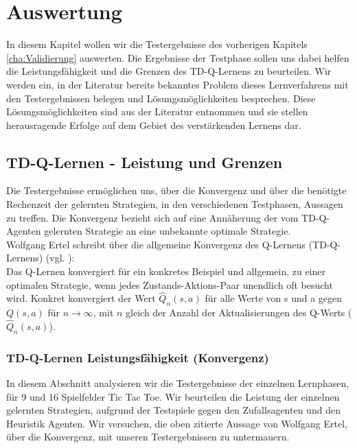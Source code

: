 \chapter{Auswertung}
\label{cha:Auswertung}
In diesem Kapitel wollen wir die Testergebnisse des vorherigen Kapitels \ref{cha:Validierung} auswerten. Die Ergebnisse der Testphase sollen uns dabei helfen die Leistungsfähigkeit und die Grenzen des TD-Q-Lernens zu beurteilen. Wir werden ein, in der Literatur bereits bekanntes Problem dieses Lernverfahrens mit den Testergebnissen belegen und Lösungsmöglichkeiten besprechen. Diese Lösungsmöglichkeiten sind aus der Literatur entnommen und sie stellen herausragende Erfolge auf dem Gebiet des verstärkenden Lernens dar. \\

\section{TD-Q-Lernen - Leistung und Grenzen}
\label{sec:TD-Q-Lernen - Leistung und Grenzen}
Die Testergebnisse ermöglichen uns, über die Konvergenz und über die benötigte Rechenzeit der gelernten Strategien, in den verschiedenen Testphasen, Aussagen zu treffen. Die Konvergenz bezieht sich auf eine Annäherung der vom TD-Q-Agenten gelernten Strategie an eine unbekannte optimale Strategie. \\

Wolfgang Ertel schreibt über die allgemeine Konvergenz des Q-Lernens (TD-Q-Lernens) (vgl. \cite[299]{Ertel}): \\

Das Q-Lernen konvergiert für ein konkretes Beispiel und allgemein, zu einer optimalen Strategie, wenn jedes Zustands-Aktions-Paar unendlich oft besucht wird. Konkret konvergiert der Wert $\hat{Q}_n(s,a)$ für alle Werte von s und a gegen $Q(s,a)$ für $n \rightarrow \infty$, mit $n$ gleich der Anzahl der Aktualisierungen des Q-Werts ($\hat{Q}_n(s,a)$).
\newpage

\subsection{TD-Q-Lernen Leistungsfähigkeit (Konvergenz)}
In diesem Abschnitt analysieren wir die Testergebnisse der einzelnen Lernphasen, für 9 und 16 Spielfelder Tic Tac Toe. Wir beurteilen die Leistung der einzelnen gelernten Strategien, aufgrund der Testspiele gegen den Zufallsagenten und den Heuristik Agenten. Wir versuchen, die oben zitierte Aussage von Wolfgang Ertel, über die Konvergenz, mit unseren Testergebnissen zu untermauern.  \\

